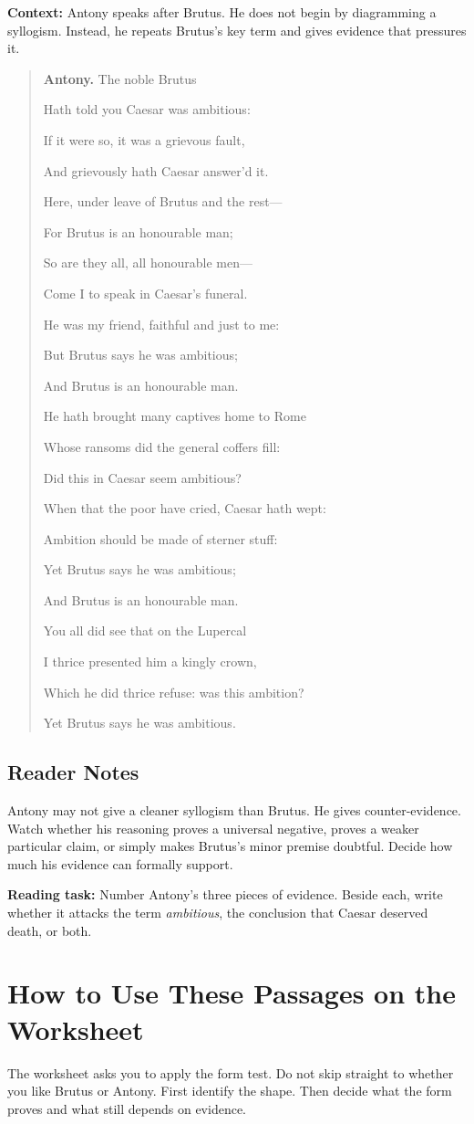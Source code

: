 \documentclass[12pt]{article}
\newenvironment{playpassage}{\begin{quote}\small\setlength{\parskip}{0.25em}}{\end{quote}}
\newcommand{\speaker}[1]{\textbf{#1.}}
\begin{document}
\textbf{Context:} Antony speaks after Brutus. He does not begin by diagramming a syllogism. Instead, he repeats Brutus's key term and gives evidence that pressures it.

\begin{playpassage}
\speaker{Antony} The noble Brutus\par
Hath told you Caesar was ambitious:\par
If it were so, it was a grievous fault,\par
And grievously hath Caesar answer'd it.\par
Here, under leave of Brutus and the rest---\par
For Brutus is an honourable man;\par
So are they all, all honourable men---\par
Come I to speak in Caesar's funeral.\par
He was my friend, faithful and just to me:\par
But Brutus says he was ambitious;\par
And Brutus is an honourable man.\par
He hath brought many captives home to Rome\par
Whose ransoms did the general coffers fill:\par
Did this in Caesar seem ambitious?\par
When that the poor have cried, Caesar hath wept:\par
Ambition should be made of sterner stuff:\par
Yet Brutus says he was ambitious;\par
And Brutus is an honourable man.\par
You all did see that on the Lupercal\par
I thrice presented him a kingly crown,\par
Which he did thrice refuse: was this ambition?\par
Yet Brutus says he was ambitious.
\end{playpassage}

\subsection*{Reader Notes}

Antony may not give a cleaner syllogism than Brutus. He gives counter-evidence. Watch whether his reasoning proves a universal negative, proves a weaker particular claim, or simply makes Brutus's minor premise doubtful. Decide how much his evidence can formally support.

\textbf{Reading task:} Number Antony's three pieces of evidence. Beside each, write whether it attacks the term \textit{ambitious}, the conclusion that Caesar deserved death, or both.

\section*{How to Use These Passages on the Worksheet}

The worksheet asks you to apply the form test. Do not skip straight to whether you like Brutus or Antony. First identify the shape. Then decide what the form proves and what still depends on evidence.
\end{document}
